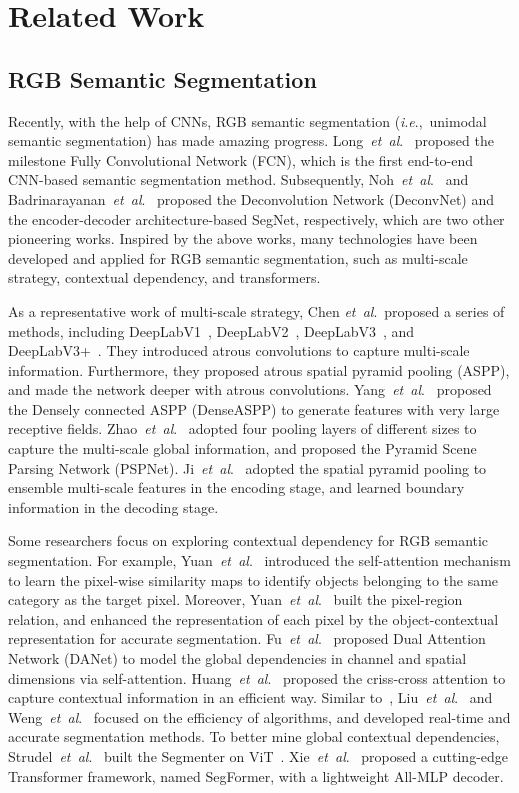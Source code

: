 \documentclass[journal]{IEEEtran}
\newcommand{\etal}{\textit{et~al}.~}
\newcommand{\ie}{\textit{i}.\textit{e}.,~}
\begin{document}
\section{Related Work}
\label{sec:related}

\subsection{RGB Semantic Segmentation}
\label{sec:Tra_ORSI_SOD}
Recently, with the help of CNNs, RGB semantic segmentation (\ie unimodal semantic segmentation) has made amazing progress.
Long~\etal\cite{2015FCN} proposed the milestone Fully Convolutional Network (FCN), which is the first end-to-end CNN-based semantic segmentation method.
Subsequently, Noh~\etal\cite{2015DeconvNet} and Badrinarayanan~\etal\cite{17SegNet} proposed the Deconvolution Network (DeconvNet) and the encoder-decoder architecture-based SegNet, respectively, which are two other pioneering works.
Inspired by the above works, many technologies have been developed and applied for RGB semantic segmentation, such as multi-scale strategy, contextual dependency, and transformers.


As a representative work of multi-scale strategy, Chen \etal proposed a series of methods, including DeepLabV1~\cite{DeepLabV1}, DeepLabV2~\cite{DeepLabV2}, DeepLabV3~\cite{DeepLabV3}, and DeepLabV3+~\cite{DeepLabV3+}.
They introduced atrous convolutions to capture multi-scale information.
Furthermore, they proposed atrous spatial pyramid pooling (ASPP), and made the network deeper with atrous convolutions.
Yang~\etal\cite{2018DenseASPP} proposed the Densely connected ASPP (DenseASPP) to generate features with very large receptive fields.
Zhao~\etal\cite{2017PSP} adopted four pooling layers of different sizes to capture the multi-scale global information, and proposed the Pyramid Scene Parsing Network (PSPNet).
Ji~\etal\cite{2021EDCC} adopted the spatial pyramid pooling to ensemble multi-scale features in the encoding stage, and learned boundary information in the decoding stage.


Some researchers focus on exploring contextual dependency for RGB semantic segmentation.
For example, Yuan~\etal\cite{2018OCNet} introduced the self-attention mechanism to learn the pixel-wise similarity maps to identify objects belonging to the same category as the target pixel.
Moreover, Yuan~\etal\cite{202OCP} built the pixel-region relation, and enhanced the representation of each pixel by the object-contextual representation for accurate segmentation.
Fu~\etal\cite{2019DANet} proposed Dual Attention Network (DANet) to model the global dependencies in channel and spatial dimensions via self-attention.
Huang~\etal\cite{2019CCNet} proposed the criss-cross attention to capture contextual information in an efficient way.
Similar to~\cite{2019CCNet}, Liu~\etal\cite{2020EfficientFCN} and Weng~\etal\cite{2022SAFA} focused on the efficiency of algorithms, and developed real-time and accurate segmentation methods.
To better mine global contextual dependencies, Strudel~\etal\cite{2021Segmenter} built the Segmenter on ViT~\cite{2021ViT}. 
Xie~\etal\cite{2021Segformer} proposed a cutting-edge Transformer framework, named SegFormer, with a lightweight All-MLP decoder.
\end{document}
